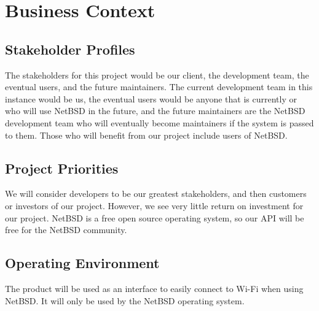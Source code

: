 \section{Business Context}

\subsection{Stakeholder Profiles}

The stakeholders for this project would be our client, the development team, the eventual users, and the future maintainers. 
The current development team in this instance would be us, the eventual users would be anyone that is currently or who will 
use NetBSD in the future, and the future maintainers are the NetBSD development team who will eventually become maintainers 
if the system is passed to them. Those who will benefit from our project include users of NetBSD. 

\subsection{Project Priorities}

We will consider developers to be our greatest stakeholders, and then customers or investors of our project. However, we see 
very little return on investment for our project. NetBSD is a free open source operating system, so our API will be free for 
the NetBSD community. 

\subsection{Operating Environment}

The product will be used as an interface to easily connect to Wi-Fi when using NetBSD. It will only be used by the NetBSD 
operating system. 
